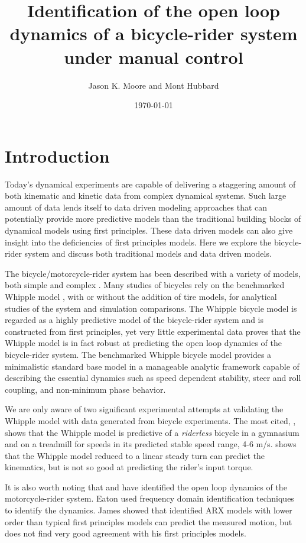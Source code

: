 \documentclass[a4paper]{article}
\title{Identification of the open loop dynamics of a bicycle-rider system under
manual control}
\author{Jason K. Moore and Mont Hubbard}
\date{\today}
\begin{document}
\maketitle

\section{Introduction}

Today's dynamical experiments are capable of delivering a staggering amount of
both kinematic and kinetic data from complex dynamical systems. Such large
amount of data lends itself to data driven modeling approaches that can
potentially provide more predictive models than the traditional building blocks
of dynamical models using first principles. These data driven models can also
give insight into the deficiencies of first principles models. Here we explore
the bicycle-rider system and discuss both traditional models and data driven
models.

The bicycle/motorcycle-rider system has been described with a variety of
models, both simple \cite{Timoshenko1948} and complex \cite{Sharp1971}. Many
studies of bicycles rely on the benchmarked Whipple model \cite{Meijaard2007},
with or without the addition of tire models, for analytical studies of the
system and simulation comparisons. The Whipple bicycle model is regarded as a
highly predictive model of the bicycle-rider system and is constructed from
first principles, yet very little experimental data proves that the Whipple
model is in fact robust at predicting the open loop dynamics of the
bicycle-rider system. The benchmarked Whipple bicycle model \cite{Meijaard2007}
provides a minimalistic standard base model in a manageable analytic framework
capable of describing the essential dynamics such as speed dependent stability,
steer and roll coupling, and non-minimum phase behavior.

We are only aware of two significant experimental attempts at validating the
Whipple model with data generated from bicycle experiments. The most cited,
\cite{Kooijman2006}, shows that the Whipple model is predictive of a
\emph{riderless} bicycle in a gymnasium and on a treadmill for speeds in its
predicted stable speed range, 4-6 m/s. \cite{Cain2011} shows that the Whipple
model reduced to a linear steady turn can predict the kinematics, but is not so
good at predicting the rider's input torque.

It is also worth noting that \cite{Eaton1973} and \cite{James2002,James2005}
have identified the open loop dynamics of the motorcycle-rider system. Eaton
used frequency domain identification techniques to identify the dynamics. James
showed that identified ARX models with lower order than typical first
principles models can predict the measured motion, but does not find very good
agreement with his first principles models.
\end{document}
